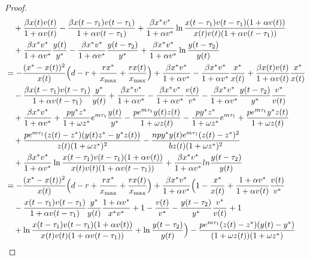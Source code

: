 \documentclass[reqno]{amsart}
\begin{document}
\begin{proof}
\begin{align*}
&\quad +\frac{\beta x(t)v(t)}{1+\alpha v(t)}
 -\frac{\beta x(t-\tau_{1})v(t-\tau_{1})}{1+\alpha v(t-\tau_{1})}
 +\frac{\beta x^{*}v^{*}}{1+\alpha v^{*}}\ln\frac{x(t-\tau_{1})
  v(t-\tau_{1})(1+\alpha v(t))}{x(t)v(t)(1+\alpha v(t-\tau_{1}))}\\
&\quad +\frac{\beta x^{*}v^{*}}{1+\alpha v^{*}}\frac{y(t)}{y^{*}} 
 -\frac{\beta x^{*}v^{*}}{1+\alpha v^{*}}\frac{y(t-\tau_{2})}{y^{*}}
 +\frac{\beta x^{*}v^{*}}{1+\alpha v^{*}}\ln\frac{y(t-\tau_{2})}{y(t)}\\
&= -\frac{(x^{*}-x(t))^{2}}{x(t)}\Big(d-r+\frac{rx^{*}}{x_{\rm max}}
 +\frac{rx(t)}{x_{\rm max}}\Big)+\frac{\beta x^{*}v^{*}}{1+\alpha v^{*}}
 -\frac{\beta x^{*}v^{*}}{1+\alpha v^{*}}\frac{x^{*}}{x(t)}
 +\frac{\beta x(t)v(t)}{1+\alpha v(t)}\frac{x^{*}}{x(t)} \\
&\quad -\frac{\beta x(t-\tau_{1})v(t-\tau_{1})}{1+\alpha v(t-\tau_{1})}
 \frac{y^{*}}{y(t)}+\frac{\beta x^{*}v^{*}}{1+\alpha v^{*}}
-\frac{\beta x^{*}v^{*}}{1+\alpha v^{*}}\frac{v(t)}{v^{*}}
 -\frac{\beta x^{*}v^{*}}{1+\alpha v^{*}}\frac{y(t-\tau_{2})}{y^{*}}\frac{v^{*}}{v(t)} \\
&\quad +\frac{\beta x^{*}v^{*}}{1+\alpha v^{*}}
 +\frac{py^{*}z^{*}}{1+\omega z^{*}}e^{m\tau_1}\frac{y(t)}{y^{*}}
 -\frac{pe^{m\tau_{1}} y(t)z(t)}{1+\omega z(t)}
 -\frac{py^{*}z^{*}}{1+\omega z^{*}}e^{m\tau_1}
 +\frac{pe^{m\tau_{1}} y^{*}z(t)}{1+\omega z(t)} \\
&\quad +\frac{pe^{m\tau_1}(z(t)-z^{*})(y(t)z^{*}-y^{*}z(t))}{z(t)(1+\omega z^{*})^{2}}
 -\frac{npy^{*}y(t)e^{m\tau_1}(z(t)-z^{*})^{2}}{bz(t)(1+\omega z^{*})^{2}} \\
&\quad +\frac{\beta x^{*}v^{*}}{1+\alpha v^{*}}\ln\frac{x(t-\tau_{1})
 v(t-\tau_{1})(1+\alpha v(t))}{x(t)v(t)(1+\alpha v(t-\tau_{1}))}
 +\frac{\beta x^{*}v^{*}}{1+\alpha v^{*}}ln\frac{y(t-\tau_{2})}{y(t)} \\
&= -\frac{(x^{*}-x(t))^{2}}{x(t)}\Big(d-r+\frac{rx^{*}}{x_{\rm max}}
 +\frac{rx(t)}{x_{\rm max}}\Big)
 +\frac{\beta x^{*}v^{*}}{1+\alpha v^{*}}\Big(1-\frac{x^{*}}{x(t)}
 +\frac{1+\alpha v^{*}}{1+\alpha v(t)}\frac{v(t)}{v^{*}} \\
&\quad - \frac{ x(t-\tau_{1})v(t-\tau_{1})}{1+\alpha 
 v(t-\tau_{1})}\frac{y^{*}}{y(t)}\frac{1+\alpha v^{*}}{x^{*}v^{*}}+1-\frac{v(t)}{v^{*}}
 -\frac{y(t-\tau_{2})}{y^{*}}\frac{v^{*}}{v(t)}+1 \\
&\quad +\ln\frac{x(t-\tau_{1})v(t-\tau_{1})(1+\alpha v(t))}{x(t)v(t)(1+\alpha 
 v(t-\tau_{1}))}+\ln\frac{y(t-\tau_{2})}{y(t)}\Big)
 -\frac{pe^{m\tau_1}(z(t)-z^{*})(y(t)-y^{*})}{(1+\omega z(t))(1+\omega z^{*})} \\

\end{align*}
\end{proof}
\end{document}
